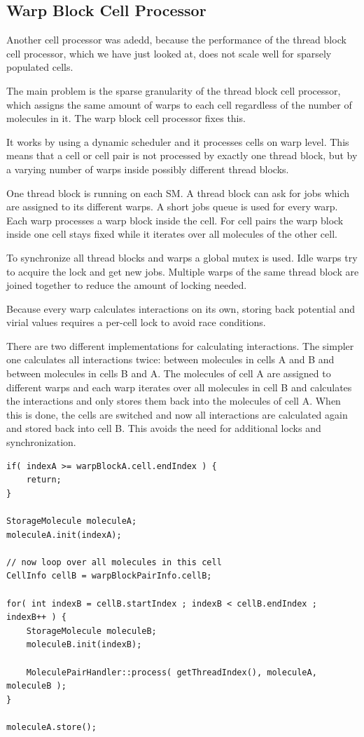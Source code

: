 \subsection{Warp Block Cell Processor}
Another cell processor was adedd, because the performance of the thread block cell processor, which we have just looked at, does not scale well for sparsely populated cells. 

The main problem is the sparse granularity of the thread block cell processor, which assigns the same amount of warps to each cell regardless of the number of molecules in it. The warp block cell processor fixes this.

It works by using a dynamic scheduler and it processes cells on warp level. This means that a cell or cell pair is not processed by exactly one thread block, but by a varying number of warps inside possibly different thread blocks.

One thread block is running on each SM. A thread block can ask for jobs which are assigned to its different warps. A short jobs queue is used for every warp. Each warp processes a warp block inside the cell. For cell pairs the warp block inside one cell stays fixed while it iterates over all molecules of the other cell.

To synchronize all thread blocks and warps a global mutex is used. Idle warps try to acquire the lock and get new jobs. Multiple warps of the same thread block are joined together to reduce the amount of locking needed.

Because every warp calculates interactions on its own, storing back potential and virial values requires a per-cell lock to avoid race conditions.

There are two different implementations for calculating interactions. The simpler one calculates all  interactions twice: between molecules in cells A and B and between molecules in cells B and A.
The molecules of cell A are assigned to different warps and each warp iterates over all molecules in cell B and calculates the interactions and only stores them back into the molecules of cell A.
When this is done, the cells are switched and now all interactions are calculated again and stored back into cell B.
This avoids the need for additional locks and synchronization.

\begin{lstlisting}[caption=inter-cell block processing (warp block cell processor)]
if( indexA >= warpBlockA.cell.endIndex ) {
	return;
}

StorageMolecule moleculeA;
moleculeA.init(indexA);

// now loop over all molecules in this cell
CellInfo cellB = warpBlockPairInfo.cellB;

for( int indexB = cellB.startIndex ; indexB < cellB.endIndex ; indexB++ ) {
	StorageMolecule moleculeB;
	moleculeB.init(indexB);

	MoleculePairHandler::process( getThreadIndex(), moleculeA, moleculeB );
}

moleculeA.store();
\end{lstlisting}


